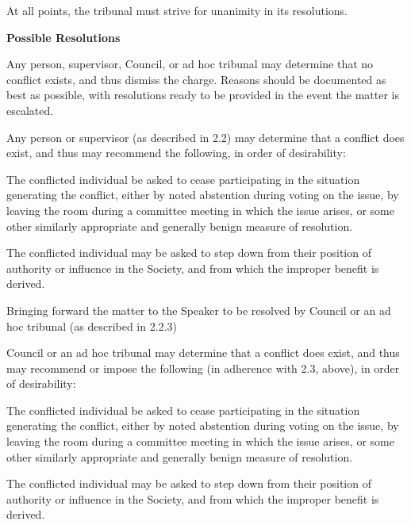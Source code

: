 \begin{longenum}[ label*=\arabic*., align=left]
\begin{longenum}[ label*=\arabic*., align=left]
        \item At all points, the tribunal must strive for unanimity in its resolutions.
	\end{longenum}
	\item \textbf{Possible Resolutions}
	\begin{longenum}[ label*=\arabic*., align=left]
		\item Any person, supervisor, Council, or ad hoc tribunal may determine that no conflict exists, and thus dismiss the charge. Reasons should be documented as best as possible, with resolutions ready to be provided in the event the matter is escalated.
        \item Any person or supervisor (as described in 2.2) may determine that a conflict does exist, and thus may recommend the following, in order of desirability:
		\begin{longenum}[ label*=\arabic*., align=left]
			\item The conflicted individual be asked to cease participating in the situation generating the conflict, either by noted abstention during voting on the issue, by leaving the room during a committee meeting in which the issue arises, or some other similarly appropriate and generally benign measure of resolution.  
            \item The conflicted individual may be asked to step down from their position of authority or influence in the Society, and from which the improper benefit is derived.
            \item Bringing forward the matter to the Speaker to be resolved by Council or an ad hoc tribunal (as described in 2.2.3)
		\end{longenum}
        \item Council or an ad hoc tribunal may determine that a conflict does exist, and thus may recommend or impose the following (in adherence with 2.3, above), in order of desirability:
		\begin{longenum}[ label*=\arabic*., align=left]
			\item The conflicted individual be asked to cease participating in the situation generating the conflict, either by noted abstention during voting on the issue, by leaving the room during a committee meeting in which the issue arises, or some other similarly appropriate and generally benign measure of resolution. 
            \item The conflicted individual may be asked to step down from their position of authority or influence in the Society, and from which the improper benefit is derived.

\end{longenum}
\end{longenum}
\end{longenum}
